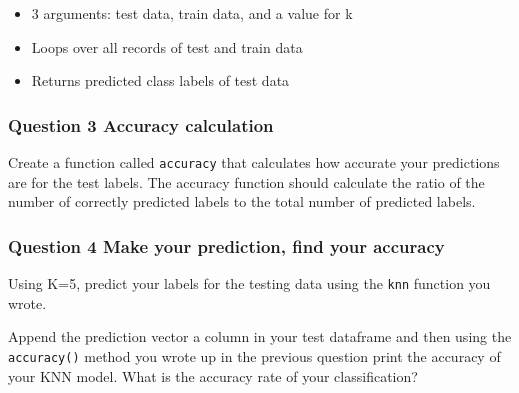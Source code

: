 \documentclass[
]{article}
\begin{document}
\begin{itemize}
\item 3 arguments: test data, train data, and a value for k
\item Loops over all records of test and train data
\item Returns predicted class labels of test data
\end{itemize}

\hypertarget{question-3-accuracy-calculation}{%
\subsubsection{Question 3 Accuracy
calculation}\label{question-3-accuracy-calculation}}

Create a function called \texttt{accuracy} that calculates how accurate
your predictions are for the test labels. The accuracy function should
calculate the ratio of the number of correctly predicted labels to the
total number of predicted labels.

\hypertarget{question-4-make-your-prediction-find-your-accuracy}{%
\subsubsection{Question 4 Make your prediction, find your
accuracy}\label{question-4-make-your-prediction-find-your-accuracy}}

Using K=5, predict your labels for the testing data using the
\texttt{knn} function you wrote.

Append the prediction vector a column in your test dataframe and then
using the \texttt{accuracy()} method you wrote up in the previous
question print the accuracy of your KNN model. What is the accuracy rate
of your classification?
\end{document}
